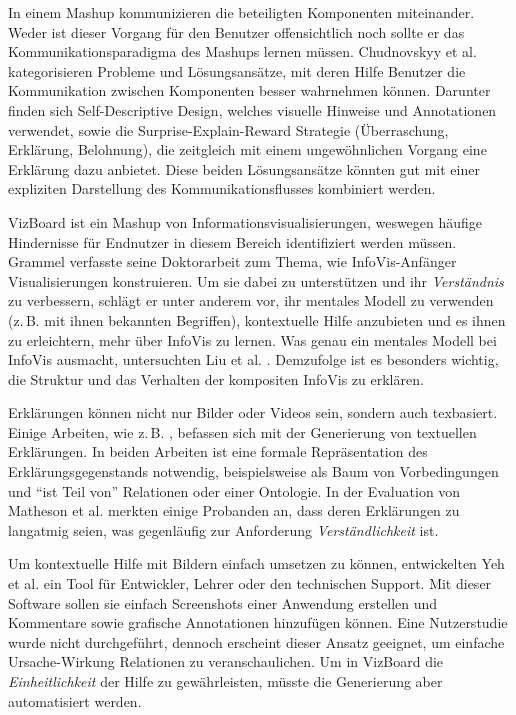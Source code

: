 \documentclass[
	headsepline,
	footsepline,
	fontsize=12pt,
	bibliography=totoc
]{scrbook}
\begin{document}
In einem Mashup kommunizieren die beteiligten Komponenten miteinander. Weder ist dieser Vorgang für den Benutzer offensichtlich noch sollte er das Kommunikationsparadigma des Mashups lernen müssen. Chudnovskyy et al. \cite{Chudnovskyy2013} kategorisieren Probleme und Lösungsansätze, mit deren Hilfe Benutzer die Kommunikation zwischen Komponenten besser wahrnehmen können. Darunter finden sich Self-Descriptive Design, welches visuelle Hinweise und Annotationen verwendet, sowie die Surprise-Explain-Reward Strategie (Überraschung, Erklärung, Belohnung), die zeitgleich mit einem ungewöhnlichen Vorgang eine Erklärung dazu anbietet. Diese beiden Lösungsansätze könnten gut mit einer expliziten Darstellung des Kommunikationsflusses kombiniert werden.


VizBoard ist ein Mashup von Informationsvisualisierungen, weswegen häufige Hindernisse für Endnutzer in diesem Bereich identifiziert werden müssen. Grammel \cite{Grammel2012} verfasste seine Doktorarbeit zum Thema, wie InfoVis-Anfänger Visualisierungen konstruieren. Um sie dabei zu unterstützen und ihr \emph{Verständnis} zu verbessern, schlägt er unter anderem vor, ihr mentales Modell zu verwenden (z.\,B. mit ihnen bekannten Begriffen), kontextuelle Hilfe anzubieten und es ihnen zu erleichtern, mehr über InfoVis zu lernen. Was genau ein mentales Modell bei InfoVis ausmacht, untersuchten Liu et al. \cite{Liu2010}. Demzufolge ist es besonders wichtig, die Struktur und das Verhalten der kompositen InfoVis zu erklären.



Erklärungen können nicht nur Bilder oder Videos sein, sondern auch texbasiert. Einige Arbeiten, wie z.\,B. \cite{Gesell2012, Matheson2012}, befassen sich mit der Generierung von textuellen Erklärungen. In beiden Arbeiten ist eine formale Repräsentation des Erklärungsgegenstands notwendig, beispielsweise als Baum von Vorbedingungen und \enquote{ist Teil von} Relationen oder einer Ontologie. In der Evaluation von Matheson et al. merkten einige Probanden an, dass deren Erklärungen zu langatmig seien, was gegenläufig zur Anforderung \emph{Verständlichkeit} ist.


Um kontextuelle Hilfe mit Bildern einfach umsetzen zu können, entwickelten Yeh et al. \cite{Yeh2011} ein Tool für Entwickler, Lehrer oder den technischen Support. Mit dieser Software sollen sie einfach Screenshots einer Anwendung erstellen und Kommentare sowie grafische Annotationen hinzufügen können. Eine Nutzerstudie wurde nicht durchgeführt, dennoch erscheint dieser Ansatz geeignet, um einfache Ursache-Wirkung Relationen zu veranschaulichen. Um in VizBoard die \emph{Einheitlichkeit} der Hilfe zu gewährleisten, müsste die Generierung aber automatisiert werden.
\end{document}
